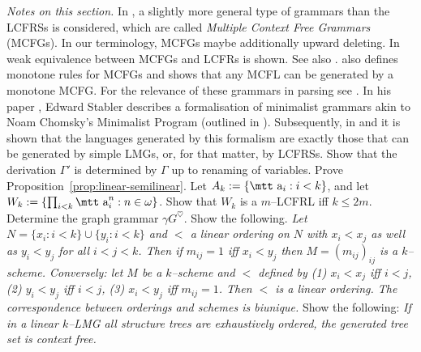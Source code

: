 {\it Notes on this section.} In \cite{seki}, a slightly more 
general type of grammars than the LCFRSs is considered, which are 
called {\it Multiple Context Free Grammars} (MCFGs). In our
terminology, MCFGs maybe additionally upward deleting. In \cite{seki} 
weak equivalence between MCFGs and LCFRs is shown. See also 
\cite{kasami:mcfg}. \cite{michaelis:minimalism} 
also defines monotone rules for MCFGs and shows that any MCFL can be  
generated by a monotone MCFG. For the relevance of these 
grammars in parsing see \cite{villemonte:parsing,villemonte:mcfg}. 
In his paper ,
Edward Stabler describes a formalisation of minimalist grammars akin
to Noam Chomsky's 
Minimalist Program (outlined in \cite{chomsky:minimalist}). Subsequently, 
in \cite{michaelis:minimalism,michaelis:lacl98,michaelis:lacl01} and
\cite{harkema:minimalism} 
it is shown that the languages
generated by this formalism are exactly those that can be generated
by simple LMGs, or, for that matter, by LCFRSs.
\vplatz
\exercise
Show that the derivation $\Gamma'$ is determined by $\Gamma$ up
to renaming of variables.
\vplatz
\exercise
Prove Proposition~\ref{prop:linear-semilinear}.
\vplatz
\exercise
Let $A_k := \{\mbox{\mtt a}_i : i < k\}$, and let 
$W_k := \{\prod_{i < k}\mbox{\mtt a}_i^n : n \in \omega\}$. 
Show that $W_k$ is a $m$--LCFRL iff $k \leq 2m$.
\vplatz
\exercise
Determine the graph grammar $\gamma G^{\heartsuit}$.
\vplatz
\exercise
Show the following. {\it Let $N = \{x_i : i < k\} \cup \{y_i : i < k\}$
and $<$ a linear ordering on $N$ with $x_i  < x_j$ as well as $y_i < y_j$
for all $i < j < k$. Then if $m_{ij} = 1$ iff
$x_i < y_j$ then $M = (m_{ij})_{ij}$ is a $k$--scheme.
Conversely: let $M$ be a $k$--scheme and $<$ defined by
(1) $x_i < x_j$ iff $i < j$, (2) $y_i < y_j$ iff
$i< j$, (3) $x_i < y_j$ iff $m_{ij} = 1$. Then
$<$ is a linear ordering. The correspondence between orderings
and schemes is biunique.}
\vplatz
\exercise
Show the following: {\it If in a linear $k$--LMG all structure trees
are exhaustively ordered, the generated tree set is context free.}
